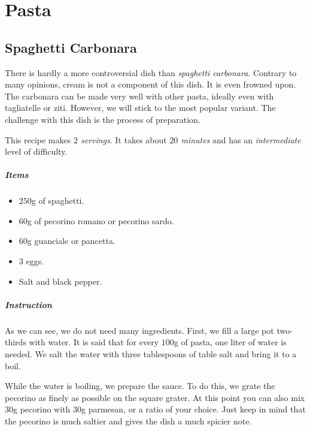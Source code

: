 \chapter{Pasta}
\section{Spaghetti Carbonara}
\label{spaghetticarbonara}
There is hardly a more controversial dish than \emph{spaghetti carbonara}. Contrary to many opinions, cream is not a component of this dish. It is even frowned upon. The carbonara can be made very well with other pasta, ideally even with tagliatelle or ziti. However, we will stick to the most popular variant. The challenge with this dish is the process of preparation.

This recipe makes \emph{$2$ servings}. It takes about \emph{$20$ minutes} and has an \emph{intermediate} level of difficulty. 

\paragraph{Items}
\begin{itemize}[noitemsep]
    \item[\ding{182}] $250$g of spaghetti.
    \item[\ding{183}] $60$g of pecorino romano or pecorino sardo.
    \item[\ding{184}] $60$g guanciale or pancetta.
    \item[\ding{185}] $3$ eggs.
    \item[\ding{186}] Salt and black pepper.
\end{itemize}

\paragraph{Instruction} 
As we can see, we do not need many ingredients. First, we fill a large pot two-thirds with water. It is said that for every $100$g of pasta, one liter of water is needed. We salt the water with three tablespoons of table salt and bring it to a boil.

While the water is boiling, we prepare the sauce. To do this, we grate the pecorino as finely as possible on the square grater. At this point you can also mix $30$g pecorino with $30$g parmesan, or a ratio of your choice. Just keep in mind that the pecorino is much saltier and gives the dish a much spicier note. 

